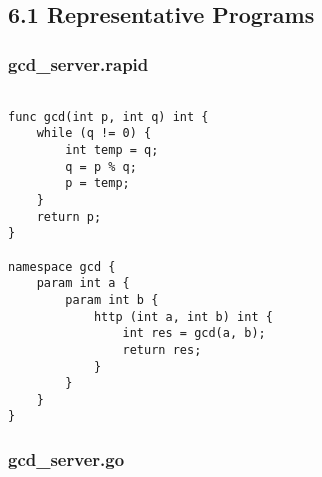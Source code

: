 \subsection*{6.1 Representative Programs}


\subsubsection*{gcd\_server.rapid}

\begin{verbatim}

func gcd(int p, int q) int {
    while (q != 0) {
        int temp = q;
        q = p % q;
        p = temp;
    }
    return p;
}

namespace gcd {
    param int a {
        param int b {
            http (int a, int b) int {
                int res = gcd(a, b);
                return res;
            }
        }
    }
}

\end{verbatim}

\subsubsection*{gcd\_server.go}

